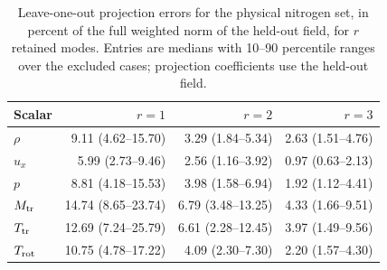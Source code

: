 \begin{table}
\centering\small
\caption{Leave-one-out projection errors for the physical nitrogen set, in percent of the full weighted norm of the held-out field, for $r$ retained modes. Entries are medians with 10--90 percentile ranges over the excluded cases; projection coefficients use the held-out field.}\label{tab:loo_pod_reconstruction}
\begin{tabular}{lrrr}\toprule
Scalar & $r=1$ & $r=2$ & $r=3$\\\midrule
$\rho$ & 9.11 (4.62--15.70) & 3.29 (1.84--5.34) & 2.63 (1.51--4.76)\\
$u_x$ & 5.99 (2.73--9.46) & 2.56 (1.16--3.92) & 0.97 (0.63--2.13)\\
$p$ & 8.81 (4.18--15.53) & 3.98 (1.58--6.94) & 1.92 (1.12--4.41)\\
$M_{\rm tr}$ & 14.74 (8.65--23.74) & 6.79 (3.48--13.25) & 4.33 (1.66--9.51)\\
$T_{\rm tr}$ & 12.69 (7.24--25.79) & 6.61 (2.28--12.45) & 3.97 (1.49--9.56)\\
$T_{\rm rot}$ & 10.75 (4.78--17.22) & 4.09 (2.30--7.30) & 2.20 (1.57--4.30)\\
\bottomrule\end{tabular}
\end{table}

